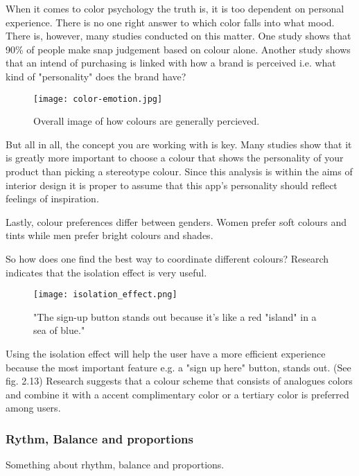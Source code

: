 When it comes to color psychology the truth is, it is too dependent on personal experience. There is no one right answer to which color falls into what mood. \cite{ColorMeaning}
There is, however, many studies conducted on this matter. 
One study shows that 90\% of people make snap judgement based on colour alone. \cite{ColorMeaning} Another study shows that an intend of purchasing is linked with how a brand is perceived i.e. what kind of "personality" does the brand have?\cite{ColorMeaning}

\begin{figure}[H]
\centering
\texttt{[image: color-emotion.jpg]}
\caption{Overall image of how colours are generally percieved. \cite{ColorMeaning}}
\end{figure}

But all in all, the concept you are working with is key. Many studies show that it is greatly more important to choose a colour that shows the personality of your product than picking a stereotype colour. \cite{ColorMeaning} %
Since this analysis is within the aims of interior design it is proper to assume that this app's personality should reflect feelings of inspiration. 

Lastly, colour preferences differ between genders. Women prefer soft colours and tints while men prefer bright colours and shades. \cite{ColorMeaning} %

So how does one find the best way to coordinate different colours? Research indicates that the isolation effect is very useful.

\begin{figure}[H]
\centering
\texttt{[image: isolation\_effect.png]}
\caption{"The sign-up button stands out because it's like a red "island" in a sea of blue." \cite{ColorMeaning}}
\end{figure}

Using the isolation effect will help the user have a more efficient experience because the most important feature e.g. a "sign up here" button, stands out. \cite{ColorMeaning} (See fig. 2.13)
Research suggests that a colour scheme that consists of analogues colors and combine it with a accent complimentary color or a tertiary color is preferred among users. \cite{ColorMeaning} %

\subsubsection{Rythm, Balance and proportions}
Something about rhythm, balance and proportions. \cite{DesignPrinciple} %

